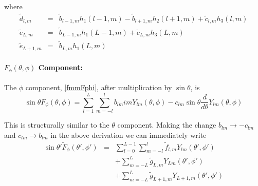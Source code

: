 where
\begin{eqnarray}
\widetilde d_{l,m} & = & \widetilde b_{l-1,m}h_1(l-1,m) - \widetilde b_{l+1,m}h_2(l+1,m) + \widetilde c_{l,m}h_3(l,m)  \\
\widetilde e_{L,m} & = & \widetilde b_{L-1,m}h_1(L-1,m) + \widetilde c_{L,m} h_3(L,m)  \label{correct1} \\
\widetilde e_{L+1,m} & = & \widetilde b_{L,m}h_1(L,m) \label{correct2}
\end{eqnarray}


\paragraph{$F_{\phi}(\theta,\phi)$ Component:}

The $\phi$ component, \eqref{fmmFphi}, after multiplication by $\sin\theta$, is
\begin{equation}
\sin\theta F_{\phi}(\theta,\phi) = \sum_{l=1}^{L} \sum_{m = -l}^{l} b_{lm}   im Y_{lm}(\theta,\phi) -c_{lm} \sin\theta\dfrac{d}{d\theta} Y_{lm}(\theta,\phi)   
\end{equation}

This is structurally similar to the $\theta$ component.  Making the change $b_{lm} \rightarrow -c_{lm}$ and $c_{lm} \rightarrow b_{lm}$ in the above derivation we can immediately write 
\begin{eqnarray}
\sin\theta' \widetilde F_{\phi}(\theta',\phi') &=& \sum_{l=0}^{L-1} \sum_{m = -l}^l \widetilde f_{l,m} Y_{lm}(\theta',\phi') \nonumber \\
\ & \ &  + \sum_{m = -L}^{L} \widetilde g_{L,m} Y_{Lm} (\theta',\phi') \nonumber \\
\ & \  & + \sum_{m = -L}^{L} \widetilde g_{L+1,m} Y_{L+1,m}(\theta',\phi')
\end{eqnarray}



